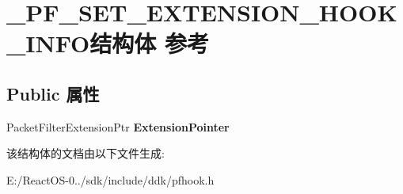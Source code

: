 \hypertarget{struct___p_f___s_e_t___e_x_t_e_n_s_i_o_n___h_o_o_k___i_n_f_o}{}\section{\+\_\+\+P\+F\+\_\+\+S\+E\+T\+\_\+\+E\+X\+T\+E\+N\+S\+I\+O\+N\+\_\+\+H\+O\+O\+K\+\_\+\+I\+N\+F\+O结构体 参考}
\label{struct___p_f___s_e_t___e_x_t_e_n_s_i_o_n___h_o_o_k___i_n_f_o}
\subsection*{Public 属性}
\begin{DoxyCompactItemize}
\item 
\mbox{\label{struct___p_f___s_e_t___e_x_t_e_n_s_i_o_n___h_o_o_k___i_n_f_o_a71bab41f77d89e9a027f06ce4c4b8f70}} 
Packet\+Filter\+Extension\+Ptr {\bfseries Extension\+Pointer}
\end{DoxyCompactItemize}


该结构体的文档由以下文件生成\+:\begin{DoxyCompactItemize}
\item 
E\+:/\+React\+O\+S-\/0../sdk/include/ddk/pfhook.\+h\end{DoxyCompactItemize}

